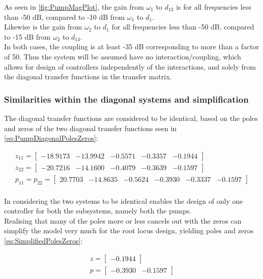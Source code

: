 As seen in \cref{fig:PumpMagPlot}, the gain from $\omega_1$ to $d_{13}$ is for all frequencies less than -50 dB, compared to -10 dB from $\omega_1$ to $d_1$. \\
Likewise is the gain from $\omega_2$ to $d_1$ for all frequencies less than -50 dB, compared to -15 dB from $\omega_2$ to $d_{13}$.\\
In both cases, the coupling is at least -35 dB corresponding to more than a factor of 50. Thus the system will be assumed have no interaction/coupling, which allows for design of controllers independently of the interactions, and solely from the diagonal transfer functions in the transfer matrix.

\subsubsection{Similarities within the diagonal systems and simplification}
The diagonal transfer functions are considered to be identical, based on the poles and zeros of the two diagonal transfer functions seen in \cref{eq:PumpDiagonalPolesZeros}: 

\begin{equation}\label{eq:PumpDiagonalPolesZeros}
	\begin{gathered}
		z_{11} = \begin{bmatrix}-18.9173&  -13.9942&   -0.5571&   -0.3357&   -0.1944 \end{bmatrix} \\
		z_{22} = \begin{bmatrix}-20.7216&  -14.1600&   -0.4079&   -0.3639&   -0.1597 \end{bmatrix} \\
		p_{11} = p_{22} = \begin{bmatrix} 20.7703&  -14.8635&   -0.5624&   -0.3930&   -0.3337&   -0.1597 \end{bmatrix} \\
	\end{gathered}
\end{equation}

In considering the two systems to be identical enables the design of only one controller for both the subsystems, namely both the pumps.\\
Realising that many of the poles more or less cancels out with the zeros can simplify the model very much for the root locus design, yielding poles and zeros \cref{eq:SimplifiedPolesZeros}:

 \begin{equation}\label{eq:SimplifiedPolesZeros}
 	\begin{gathered}
 		z = \begin{bmatrix}  -0.1944 \end{bmatrix} \\
 		p = \begin{bmatrix}  -0.3930&  -0.1597 \end{bmatrix} \\
 	\end{gathered}
 \end{equation}

